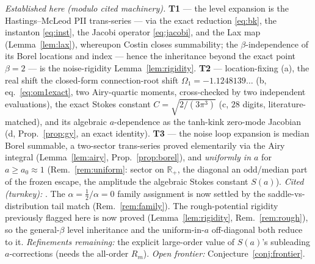 \documentclass[11pt,reqno]{amsart}
\theoremstyle{plain}
\theoremstyle{definition}
\theoremstyle{remark}
\newcommand{\R}{\mathbb{R}}
\begin{document}
\emph{Established here (modulo cited machinery).} \textbf{T1} --- the level expansion is the
Hastings--McLeod PII trans-series --- via the exact reduction \eqref{eq:bk}, the instanton
\eqref{eq:inst}, the Jacobi operator \eqref{eq:jacobi}, and the Lax map (Lemma~\ref{lem:lax}),
whereupon Costin \cite{Costin} closes summability; the $\beta$-independence of its Borel locations and
index --- hence the inheritance beyond the exact point $\beta=2$ --- is the noise-rigidity
Lemma~\ref{lem:rigidity}. \textbf{T2} --- location-fixing (a), the real shift
the closed-form connection-root shift $\Omega_1=-1.1248139\ldots$ (b, eq.~\eqref{eq:om1exact}, two
Airy-quartic moments, cross-checked by two independent evaluations), the exact Stokes constant
$C=\sqrt{2/(3\pi^3)}$ (c, $28$
digits, literature-matched), and its algebraic $a$-dependence as the
tanh-kink zero-mode Jacobian (d, Prop.~\ref{prop:gy}, an exact identity). \textbf{T3} --- the noise loop
expansion is median Borel summable, a two-sector trans-series proved elementarily via the Airy
integral (Lemma~\ref{lem:airy}, Prop.~\ref{prop:borel}), and \emph{uniformly in $a$} for $a\ge a_0\approx1$
(Rem.~\ref{rem:uniform}: sector on $\R_+$, the diagonal an odd/median part of the frozen escape, the
amplitude the algebraic Stokes constant $S(a)$). \emph{Cited (turnkey):}
\cite{RRV,DV,BorotNadal,CLDS,CleriDunne,Costin,CCK,SGG,TW1994,FN1980,JMU1981,FIKN,Clarkson,Dunne2025,KapaevHM,BothnerRHP,Sokal,Viens}.
The $\alpha=\tfrac12/\alpha=0$ family assignment is now settled by the saddle-vs-distribution tail
match (Rem.~\ref{rem:family}). The rough-potential rigidity previously flagged here is now proved
(Lemma~\ref{lem:rigidity}, Rem.~\ref{rem:rough}), so the general-$\beta$ level inheritance and the
uniform-in-$a$ off-diagonal both reduce to it. \emph{Refinements remaining:} the explicit large-order
value of $S(a)$'s subleading $a$-corrections (needs the all-order $R_m$). \emph{Open frontier:}
Conjecture~\ref{conj:frontier}.
\end{document}
